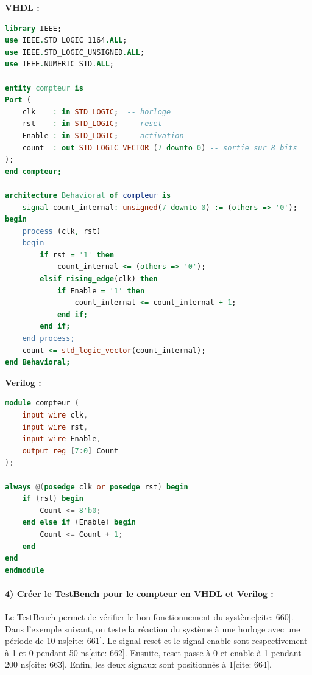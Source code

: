 \documentclass[11pt,a4paper]{article}
\begin{document}
\textbf{VHDL :}
\begin{lstlisting}[language=VHDL]
library IEEE;
use IEEE.STD_LOGIC_1164.ALL;
use IEEE.STD_LOGIC_UNSIGNED.ALL;
use IEEE.NUMERIC_STD.ALL;

entity compteur is
Port (
    clk    : in STD_LOGIC;  -- horloge
    rst    : in STD_LOGIC;  -- reset
    Enable : in STD_LOGIC;  -- activation
    count  : out STD_LOGIC_VECTOR (7 downto 0) -- sortie sur 8 bits
);
end compteur;

architecture Behavioral of compteur is
    signal count_internal: unsigned(7 downto 0) := (others => '0');
begin
    process (clk, rst)
    begin
        if rst = '1' then
            count_internal <= (others => '0');
        elsif rising_edge(clk) then
            if Enable = '1' then
                count_internal <= count_internal + 1;
            end if;
        end if;
    end process;
    count <= std_logic_vector(count_internal);
end Behavioral;
\end{lstlisting}

\textbf{Verilog :}
\begin{lstlisting}[language=Verilog]
module compteur (
    input wire clk,
    input wire rst,
    input wire Enable,
    output reg [7:0] Count 
);

always @(posedge clk or posedge rst) begin
    if (rst) begin
        Count <= 8'b0;
    end else if (Enable) begin
        Count <= Count + 1;
    end
end
endmodule
\end{lstlisting}

\paragraph{4) Créer le TestBench pour le compteur en VHDL et Verilog :}
Le TestBench permet de vérifier le bon fonctionnement du système[cite: 660]. Dans l'exemple suivant, on teste la réaction du système à une horloge avec une période de 10 ns[cite: 661]. Le signal reset et le signal enable sont respectivement à 1 et 0 pendant 50 ns[cite: 662]. Ensuite, reset passe à 0 et enable à 1 pendant 200 ns[cite: 663]. Enfin, les deux signaux sont positionnés à 1[cite: 664].
\end{document}
